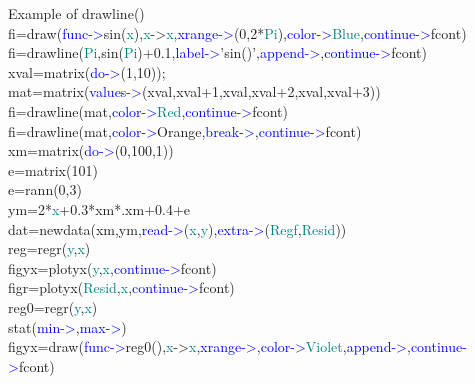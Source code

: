 \begin{example}[drawlineex]Example of \textcolor{VioletRed}{drawline}()\\ 
\label{drawlineex} 
\noindent fi=\textcolor{VioletRed}{draw}(\textcolor{blue}{func->}\textcolor{VioletRed}{sin}(\textcolor{teal}{x}),\textcolor{teal}{x}->\textcolor{teal}{x},\textcolor{blue}{xrange->}(0,2*\textcolor{teal}{Pi}),\textcolor{blue}{color->}\textcolor{teal}{Blue},\textcolor{blue}{continue->}fcont)\\ 
fi=\textcolor{VioletRed}{drawline}(\textcolor{teal}{Pi},\textcolor{VioletRed}{sin}(\textcolor{teal}{Pi})+0.1,\textcolor{blue}{label->}'\textcolor{VioletRed}{sin}()',\textcolor{blue}{append->},\textcolor{blue}{continue->}fcont)\\ 
xval=\textcolor{VioletRed}{matrix}(\textcolor{blue}{do->}(1,10));\\ 
mat=\textcolor{VioletRed}{matrix}(\textcolor{blue}{values->}(xval,xval+1,xval,xval+2,xval,xval+3))\\ 
fi=\textcolor{VioletRed}{drawline}(mat,\textcolor{blue}{color->}\textcolor{teal}{Red},\textcolor{blue}{continue->}fcont)\\ 
fi=\textcolor{VioletRed}{drawline}(mat,\textcolor{blue}{color->}Orange,\textcolor{blue}{break->},\textcolor{blue}{continue->}fcont)\\ 
xm=\textcolor{VioletRed}{matrix}(\textcolor{blue}{do->}(0,100,1))\\ 
e=\textcolor{VioletRed}{matrix}(101)\\ 
e=\textcolor{VioletRed}{rann}(0,3)\\ 
ym=2*\textcolor{teal}{x}+0.3*xm*.xm+0.4+e\\ 
dat=\textcolor{VioletRed}{newdata}(xm,ym,\textcolor{blue}{read->}(\textcolor{teal}{x},\textcolor{teal}{y}),\textcolor{blue}{extra->}(\textcolor{teal}{Regf},\textcolor{teal}{Resid}))\\ 
reg=\textcolor{VioletRed}{regr}(\textcolor{teal}{y},\textcolor{teal}{x})\\ 
figyx=\textcolor{VioletRed}{plotyx}(\textcolor{teal}{y},\textcolor{teal}{x},\textcolor{blue}{continue->}fcont)\\ 
figr=\textcolor{VioletRed}{plotyx}(\textcolor{teal}{Resid},\textcolor{teal}{x},\textcolor{blue}{continue->}fcont)\\ 
reg0=\textcolor{VioletRed}{regr}(\textcolor{teal}{y},\textcolor{teal}{x})\\ 
\textcolor{VioletRed}{stat}(\textcolor{blue}{min->},\textcolor{blue}{max->})\\ 
figyx=\textcolor{VioletRed}{draw}(\textcolor{blue}{func->}reg0(),\textcolor{teal}{x}->\textcolor{teal}{x},\textcolor{blue}{xrange->},\textcolor{blue}{color->}\textcolor{teal}{Violet},\textcolor{blue}{append->},\textcolor{blue}{continue->}fcont)\\ 
 

\end{example}
